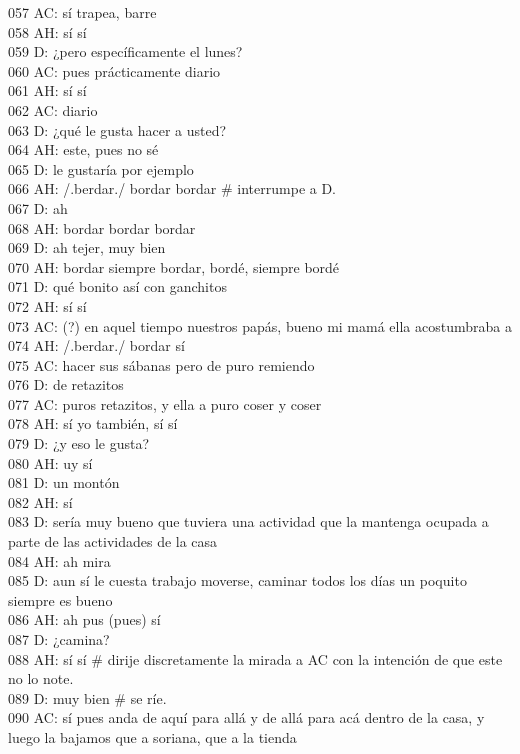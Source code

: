 057 AC: sí trapea, barre\\
058 AH: sí sí\\
059 D: ¿pero específicamente el lunes?\\
060 AC: pues prácticamente diario\\
061 AH: sí sí\\
062 AC: diario\\
063 D: ¿qué le gusta hacer a usted?\\
064 AH: este, pues no sé\\
065 D: le gustaría por ejemplo\\
066 AH: /.berdar./ bordar bordar \# interrumpe a D.\\
067 D: ah\\
068 AH: bordar bordar bordar\\
069 D: ah tejer, muy bien\\
070 AH: bordar siempre bordar, bordé, siempre bordé\\
071 D: qué bonito así con ganchitos\\
072 AH: sí sí\\
073 AC: (?) en aquel tiempo nuestros papás, bueno mi mamá ella acostumbraba a\\
074 AH: /.berdar./ bordar sí\\
075 AC: hacer sus sábanas pero de puro remiendo\\
076 D: de retazitos\\
077 AC: puros retazitos, y ella a puro coser y coser\\
078 AH: sí yo también, sí sí\\
079 D: ¿y eso le gusta?\\
080 AH: uy sí\\
081 D: un montón\\
082 AH: sí\\
083 D: sería muy bueno que tuviera una actividad que la mantenga ocupada a parte de las actividades de la casa\\
084 AH: ah mira\\
085 D: aun sí le cuesta trabajo moverse, caminar todos los días un poquito siempre es bueno\\
086 AH: ah pus (pues) sí\\
087 D: ¿camina?\\
088 AH: sí sí \# dirije discretamente la mirada a AC con la intención de que este no lo note.\\
089 D: muy bien \# se ríe.\\
090 AC: sí pues anda de aquí para allá y de allá para acá dentro de la casa, y luego la bajamos que a soriana, que a la tienda\\
